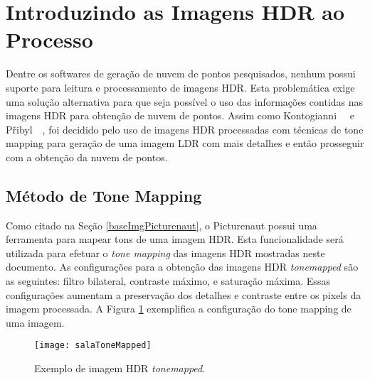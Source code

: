 \section{Introduzindo as Imagens HDR ao Processo} \label{pontosProcesso}

Dentre os softwares de geração de nuvem de pontos pesquisados, nenhum possui suporte para leitura e processamento de imagens HDR. Esta problemática exige uma solução alternativa para que seja possível o uso das informações contidas nas imagens HDR para obtenção de nuvem de pontos. Assim como Kontogianni~\etal~\cite{hdr3d} e P\v{r}ibyl~\etal~\cite{hdr3d2}, foi decidido pelo uso de imagens HDR processadas com técnicas de tone mapping para geração de uma imagem LDR com mais detalhes e então prosseguir com a obtenção da nuvem de pontos.

\subsection{Método de Tone Mapping} \label{pontosToneMapping}

Como citado na Seção \ref{baseImgPicturenaut}, o Picturenaut possui uma ferramenta para mapear tons de uma imagem HDR. Esta funcionalidade será utilizada para efetuar o \textit{tone mapping} das imagens HDR mostradas neste documento. As configurações para a obtenção das imagens HDR \textit{tonemapped} são as seguintes: filtro bilateral, contraste máximo, e saturação máxima. Essas configurações aumentam a preservação dos detalhes e contraste entre os pixels da imagem processada. A Figura \ref{figPontosToneMapping} exemplifica a configuração do tone mapping de uma imagem.

\begin{figure}[H]
  \centering
  \texttt{[image: salaToneMapped]}
  \caption{Exemplo de imagem HDR \textit{tonemapped}.}
  \label{figPontosToneMapping}
\end{figure}